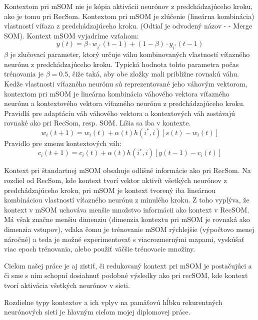 Kontextom pri mSOM nie je kópia aktivácii neurónov z predchádzajúceho kroku, ako je tomu pri RecSom. 
Kontextom pri mSOM je zlúčenie (lineárna kombinácia) vlastností víťaza z predchádzajúceho kroku.
(Odtiaľ je odvodený názov -  - Merge SOM). 
Kontext mSOM vyjadríme vzťahom:
\begin{equation}
	y(t) = \beta \cdot w_{i^{*}}(t-1) + (1 - \beta) \cdot y_{i^{*}}(t-1)
\end{equation}
$\beta$ je zlučovací parameter, ktorý určuje váhu kombinovaných vlastností
víťazného neurónu z predchádzajúceho kroku. Typická hodnota tohto parametra
počas trénovania je $\beta = 0.5$, čiže taká, aby obe zložky mali približne 
rovnakú váhu. 
Kedže vlastnosti víťazného neurónu sú reprezentované jeho váhovým vektorom, 
kontextom pri mSOM je lineárna kombinácia váhového vektora víťazného neurónu a 
kontextového vektora víťazného neurónu z predchádzajúceho kroku.
Pravidlá pre adaptáciu váh váhového vektora a kontextových váh zostávajú rovnaké ako pri RecSom, resp. SOM. Líšia sa iba v kontexte.
\begin{equation}
	w_i(t + 1) = w_i(t) + \alpha(t)h(i^*, i)[s(t) - w_i(t)]
\end{equation}
Pravidlo pre zmenu kontextových váh:
\begin{equation}
	c_i(t + 1) = c_i(t) + \alpha(t)h(i^*, i)[y(t - 1) - c_i(t)]
\end{equation}

Kontext pri štandartnej mSOM obsahuje odlišné informácie ako pri RecSom.
Na rozdiel od RecSom, kde kontext tvorí vektor aktivít všetkých neurónov z predchádzajúceho kroku, pri
mSOM je kontext tvorený iba lineárnou kombináciou vlastností víťazného neurónu z minulého kroku. Z toho vyplýva, že
kontext v mSOM uchováva menšie množstvo informácii ako kontext v RecSOM.
Má však značne menšiu dimenziu (dimenzia kontextu pri mSOM je rovnaká ako dimenzia vstupov),
vďaka čomu je trénovanie mSOM rýchlejšie (výpočtovo menej náročné) a teda je možné experimentovať 
s viacrozmernými mapami, vyskúšať viac epoch trénovania, alebo použiť väčšie trénovacie množiny.

Cieľom našej práce je aj zistiť, či redukovaný kontext pri mSOM je postačujúci a či sme s ním 
schopní dosiahnuť podobné výsledky ako pri recSOM, kde kontext tvorí aktivácia všetkých neurónov v sieti.

Rozdielne typy kontextov a ich vplyv na pamäťovú hĺbku rekurentných 
neurónových sietí je hlavným cieľom mojej diplomovej práce.





